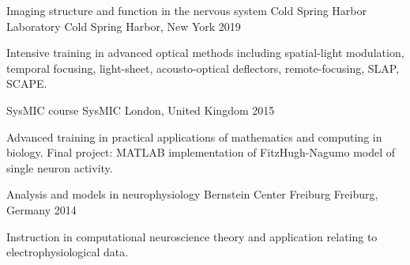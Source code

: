 

\begin{cventries}

  \cventry%
    {Imaging structure and function in the nervous system} %
    {Cold Spring Harbor Laboratory} %
    {Cold Spring Harbor, New York} %
    {2019} %
    {%
      \begin{cvitems} %
        \item {Intensive training in advanced optical methods including spatial-light
        modulation, temporal focusing, light-sheet, acousto-optical deflectors,
        remote-focusing, SLAP, SCAPE.}
      \end{cvitems}
    }

  \cventry%
    {SysMIC course} %
    {SysMIC} %
    {London, United Kingdom} %
    {2015} %
    {%
      \begin{cvitems} %
        \item {Advanced training in practical applications of
        mathematics and computing in biology. Final project: MATLAB implementation of
        FitzHugh-Nagumo model of single neuron activity.}
      \end{cvitems}
    }
    
  \cventry%
    {Analysis and models in neurophysiology} %
    {Bernstein Center Freiburg} %
    {Freiburg, Germany} %
    {2014} %
    {%
      \begin{cvitems} %
        \item {Instruction in computational neuroscience theory and application relating to electrophysiological data.}
      \end{cvitems}
    }
\end{cventries}
